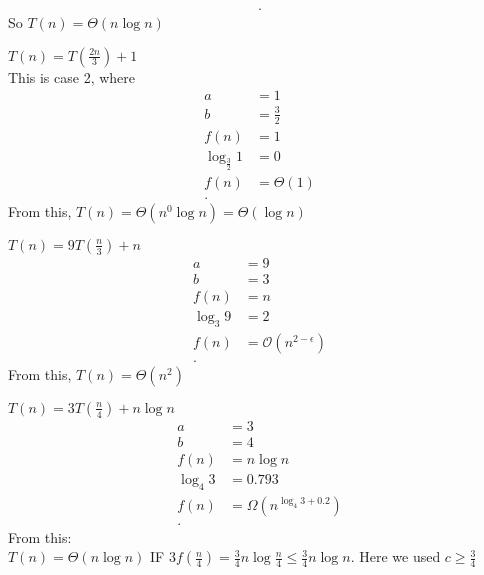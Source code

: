 \begin{itemize}
\begin{example}
\begin{align*}
		.\end{align*}
		So $T(n) = \Theta\left( n \log n \right) $
	\end{example}
	\begin{example}
		$T(n) = T\left( \frac{2n}{3} \right) + 1$\\
		This is case 2, where
		\begin{align*}
			a &=  1 \\ b &= \frac{3}{2} \\ f\left( n \right) &= 1 \\
			\log_{\frac{3}{2}}1 &= 0 \\
			f\left( n \right)  &= \Theta\left( 1 \right)  \\
		.\end{align*}
		From this, $T(n) =  \Theta\left( n^{0} \log n \right) = \Theta\left( \log n \right) $
	\end{example}
	\begin{example}
		$T(n) = 9T\left( \frac{n}{3} \right) + n$ 
		\begin{align*}
			a &=  9 \\
			b &=  3 \\
			f(n) &=  n \\
			\log_3 9 &=  2 \\
			f(n) &=  \mathcal O\left( n^{2-\epsilon} \right)  \\
		.\end{align*}
		From this, $T(n) =  \Theta\left( n^2 \right)$
	\end{example}
	\begin{example}
		$T(n) = 3T\left( \frac{n}{4} \right) + n \log n$ 
		\begin{align*}
			a &=  3 \\
			b &= 4 \\
			f(n) &=  n \log n \\
			\log_4 3 &= 0.793\\
			f\left( n \right)  &=  \Omega\left( n^{\log_4 3 + 0.2} \right)  \\
		.\end{align*}
		From this:\\
		$T(n) = \Theta\left( n \log n \right)$ IF $3f\left( \frac{n}{4} \right) = \frac{3}{4} n \log \frac{n}{4} \le  \frac{3}{4} n \log n$. Here we used $c \ge \frac{3}{4}$ 


\end{example}
\end{itemize}
